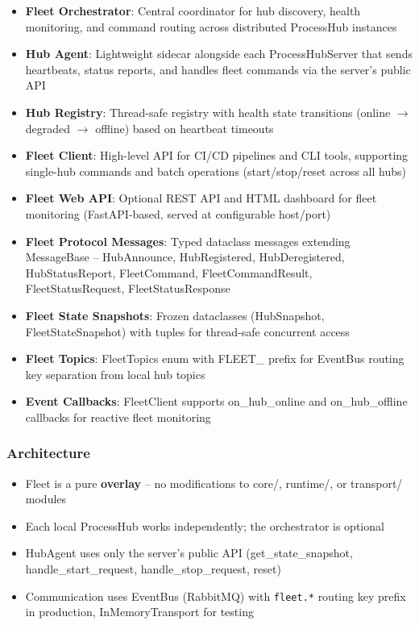 \begin{itemize}
   \item \textbf{Fleet Orchestrator}: Central coordinator for hub discovery, health monitoring,
         and command routing across distributed ProcessHub instances
   \item \textbf{Hub Agent}: Lightweight sidecar alongside each ProcessHubServer that sends
         heartbeats, status reports, and handles fleet commands via the server's public API
   \item \textbf{Hub Registry}: Thread-safe registry with health state transitions
         (online $\rightarrow$ degraded $\rightarrow$ offline) based on heartbeat timeouts
   \item \textbf{Fleet Client}: High-level API for CI/CD pipelines and CLI tools, supporting
         single-hub commands and batch operations (start/stop/reset across all hubs)
   \item \textbf{Fleet Web API}: Optional REST API and HTML dashboard for fleet monitoring
         (FastAPI-based, served at configurable host/port)
   \item \textbf{Fleet Protocol Messages}: Typed dataclass messages extending MessageBase --
         HubAnnounce, HubRegistered, HubDeregistered, HubStatusReport, FleetCommand,
         FleetCommandResult, FleetStatusRequest, FleetStatusResponse
   \item \textbf{Fleet State Snapshots}: Frozen dataclasses (HubSnapshot, FleetStateSnapshot)
         with tuples for thread-safe concurrent access
   \item \textbf{Fleet Topics}: FleetTopics enum with FLEET\_ prefix for EventBus routing
         key separation from local hub topics
   \item \textbf{Event Callbacks}: FleetClient supports on\_hub\_online and on\_hub\_offline
         callbacks for reactive fleet monitoring
\end{itemize}

\subsubsection{Architecture}

\begin{itemize}
   \item Fleet is a pure \textbf{overlay} -- no modifications to core/, runtime/, or transport/ modules
   \item Each local ProcessHub works independently; the orchestrator is optional
   \item HubAgent uses only the server's public API (get\_state\_snapshot, handle\_start\_request,
         handle\_stop\_request, reset)
   \item Communication uses EventBus (RabbitMQ) with \texttt{fleet.*} routing key prefix in production,
         InMemoryTransport for testing
\end{itemize}


